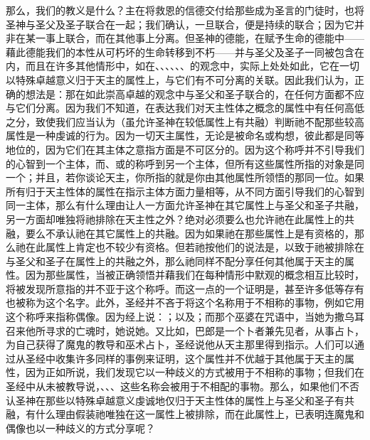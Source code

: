 那么，我们的教义是什么？主在将救恩的信德交付给那些成为圣言的门徒时，也将圣神与圣父及圣子联合在一起；我们确认，一旦联合，便是持续的联合；因为它并非在某一事上联合，而在其他事上分离。但圣神的德能，在赋予生命的德能中——藉此德能我们的本性从可朽坏的生命转移到不朽——并与圣父及圣子一同被包含在内，而且在许多其他情形中，如在、、、、、、的观念中，实际上处处如此，它在一切以特殊卓越意义归于天主的属性上，与它们有不可分离的关联。因此我们认为，正确的想法是：那在如此崇高卓越的观念中与圣父和圣子联合的，在任何方面都不应与它们分离。因为我们不知道，在表达我们对天主性体之概念的属性中有任何高低之分，致使我们应当认为（虽允许圣神在较低属性上有共融）判断祂不配那些较高属性是一种虔诚的行为。因为一切天主属性，无论是被命名或构想，彼此都是同等地位的，因为它们在其主体之意指方面是不可区分的。因为这个称呼并不引导我们的心智到一个主体，而、或的称呼到另一个主体，但所有这些属性所指的对象是同一个；并且，若你谈论天主，你所指的就是你由其他属性所领悟的那同一位。如果所有归于天主性体的属性在指示主体方面力量相等，从不同方面引导我们的心智到同一主体，那么有什么理由让人一方面允许圣神在其它属性上与圣父和圣子共融，另一方面却唯独将祂排除在天主性之外？绝对必须要么也允许祂在此属性上的共融，要么不承认祂在其它属性上的共融。因为如果祂在那些属性上是有资格的，那么祂在此属性上肯定也不较少有资格。但若祂按他们的说法是，以致于祂被排除在与圣父和圣子在属性上的共融之外，那么祂同样不配分享任何其他属于天主的属性。因为那些属性，当被正确领悟并藉我们在每种情形中默观的概念相互比较时，将被发现所意指的并不亚于这个称呼。而这一点的一个证明是，甚至许多低等存有也被称为这个名字。此外，圣经并不吝于将这个名称用于不相称的事物，例如它用这个称呼来指称偶像。因为经上说：；以及；而那个巫婆在咒语中，当她为撒乌耳召来他所寻求的亡魂时，她说她。又比如，巴郎是一个卜者兼先见者，从事占卜，为自己获得了魔鬼的教导和巫术占卜，圣经说他从天主那里得到指示。人们可以通过从圣经中收集许多同样的事例来证明，这个属性并不优越于其他属于天主的属性，因为正如所说，我们发现它以一种歧义的方式被用于不相称的事物；但我们在圣经中从未被教导说，、、、这些名称会被用于不相配的事物。那么，如果他们不否认圣神在那些以特殊卓越意义虔诚地仅归于天主性体的属性上与圣父和圣子有共融，有什么理由假装祂唯独在这一属性上被排除，而在此属性上，已表明连魔鬼和偶像也以一种歧义的方式分享呢？\par

